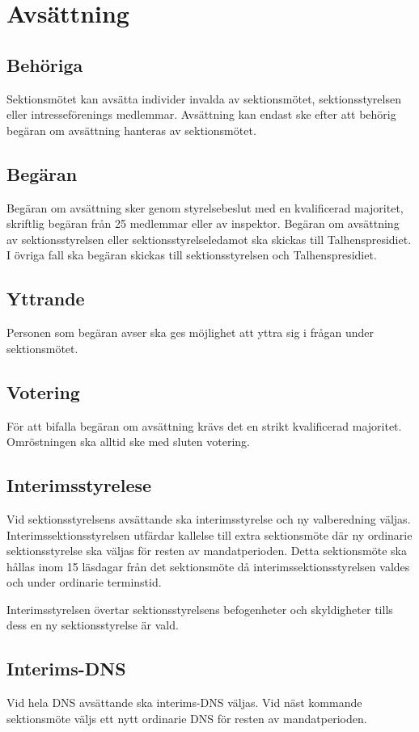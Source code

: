 \section{Avsättning}
\subsection{Behöriga}
Sektionsmötet kan avsätta individer invalda av sektionsmötet, sektionsstyrelsen eller intresseförenings medlemmar.
Avsättning kan endast ske efter att behörig begäran om avsättning hanteras av sektionsmötet.
\subsection{Begäran}
Begäran om avsättning sker genom styrelsebeslut med en kvalificerad majoritet, skriftlig begäran från 25 medlemmar eller av inspektor.
Begäran om avsättning av sektionsstyrelsen eller sektionsstyrelseledamot ska skickas till Talhenspresidiet.
I övriga fall ska begäran skickas till sektionsstyrelsen och Talhenspresidiet.
\subsection{Yttrande}
Personen som begäran avser ska ges möjlighet att yttra sig i frågan under sektionsmötet.
\subsection{Votering}
För att bifalla begäran om avsättning krävs det en strikt kvalificerad majoritet.
Omröstningen ska alltid ske med sluten votering.
\subsection{Interimsstyrelese}
Vid sektionsstyrelsens avsättande ska interimsstyrelse och ny valberedning väljas.
Interimssektionsstyrelsen utfärdar kallelse till extra sektionsmöte där ny ordinarie sektionsstyrelse ska väljas för resten av mandatperioden.
Detta sektionsmöte ska hållas inom 15 läsdagar från det sektionsmöte då interimssektionsstyrelsen valdes och under ordinarie terminstid.

Interimsstyrelsen övertar sektionsstyrelsens befogenheter och skyldigheter tills dess en ny sektionsstyrelse är vald.
\subsection{Interims-DNS}
Vid hela DNS avsättande ska interims-DNS väljas.
Vid näst kommande sektionsmöte väljs ett nytt ordinarie DNS för resten av mandatperioden.

